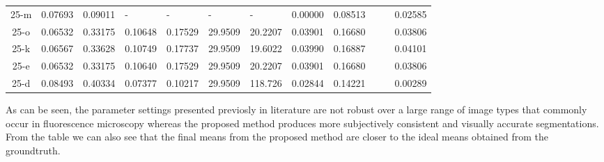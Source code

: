 \begin{footnotesize}
\begin{longtabu}{|c|X|X|X|X|X|X|X|X|X|X|X|}
\hhline{---------~~-}	25-m	&	0.07693	&	0.09011	&\centering	-	&\centering	-	&\centering	-	&	\centering-		&	0.00000	&	0.08513	&		&		&	0.02585 \\
\hhline{---------~~-}	25-o	&	0.06532	&	0.33175	&	0.10648	&	0.17529 &	29.9509	&	20.2207 	&	0.03901	&	0.16680	&		&		&	0.03806	\\
\hhline{---------~~-}	25-k	&	0.06567	&	0.33628	&	0.10749	&	0.17737	&	29.9509	&	19.6022 	&	0.03990	&	0.16887	&		&		&	0.04101	\\
\hhline{---------~~-}	25-e	&	0.06532	&	0.33175	&	0.10640	&	0.17529	&	29.9509	&	20.2207 	&	0.03901	&	0.16680	&		&		&	0.03806	\\
\hhline{---------~~-}	25-d	&	0.08493	&	0.40334	&	0.07377	&	0.10217	&	29.9509	&	118.726 	&	0.02844	&	0.14221	&		&		&	0.00289	\\
\hline 
\end{longtabu} 
\end{footnotesize}

As can be seen, the parameter settings presented previosly in literature are not robust over a large range of image types that commonly occur in fluorescence microscopy whereas the proposed method produces more subjectively consistent and visually accurate segmentations. From the table we can also see that the final means from the proposed method are closer to the ideal means obtained from the groundtruth.

